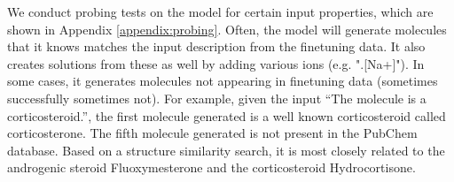 We conduct probing tests on the model for certain input properties, which are shown in Appendix \ref{appendix:probing}. Often, the model will generate molecules that it knows matches the input description from the finetuning data. It also creates solutions from these as well by adding various ions (e.g. ".[Na+]"). In some cases, it generates molecules not appearing in finetuning data (sometimes successfully sometimes not). For example, given the input ``The molecule is a corticosteroid.'', the first molecule generated is a well known corticosteroid called corticosterone. The fifth molecule generated is not present in the PubChem database. Based on a structure similarity search, it is most closely related to the androgenic steroid Fluoxymesterone and the corticosteroid Hydrocortisone.
